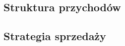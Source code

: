 \documentclass[12pt]{article}
\begin{document}

\subsection{Struktura przychodów}




\subsection{Strategia sprzedaży}


\end{document}
